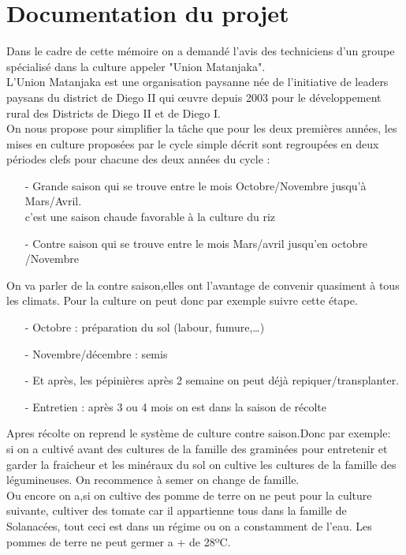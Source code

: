 \section{Documentation du projet}
Dans le cadre de cette mémoire on a demandé l’avis des techniciens d’un groupe spécialisé dans la culture appeler "Union Matanjaka".\\
L'Union Matanjaka est une organisation paysanne née de l'initiative de leaders paysans du district de Diego II qui œuvre depuis 2003 pour le développement rural des Districts de Diego II et de Diego I.\\
On nous  propose  pour  simplifier  la tâche  que pour les deux premières années, les mises en culture proposées par le cycle simple décrit sont regroupées en deux périodes clefs pour chacune des deux années du cycle :
\begin{itemize}
\item[-]Grande saison qui se trouve entre le mois Octobre/Novembre  jusqu’à Mars/Avril.\\
c'est une saison chaude favorable à la culture du riz
\item[-]Contre saison qui se trouve entre le mois Mars/avril jusqu’en  octobre /Novembre		
\end{itemize}
On va parler de la contre saison,elles ont l’avantage de convenir quasiment à tous les climats.
Pour la culture on peut donc par exemple suivre cette étape.
\begin{itemize}
\item[-]Octobre : préparation du sol (labour, fumure,…)
\item[-]Novembre/décembre : semis
\item[-]Et après, les pépinières après  2 semaine on peut déjà repiquer/transplanter.
\item[-]Entretien : après 3 ou 4 mois on est dans la saison de récolte
\end{itemize} 
Apres récolte on reprend le système de culture contre saison.Donc par exemple:\\
si on a cultivé avant des cultures de la famille des graminées pour entretenir et garder la fraicheur et les minéraux du sol on cultive les cultures de la famille des légumineuses. On recommence à semer on change de famille.\\
Ou encore on a,si on cultive des pomme de terre  on ne peut pour la culture suivante, cultiver des tomate car il appartienne tous dans la famille de Solanacées, tout ceci est dans un régime ou on a constamment de l’eau.
Les pommes de terre ne peut germer a + de 28ºC.\\
